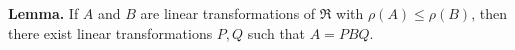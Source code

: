 \textbf{Lemma.} If $A$ and $B$ are linear transformations of $\mathfrak{R}$ with $\rho(A) \leq \rho(B)$, then there exist linear transformations $P, Q$ such that $A = PBQ$.
